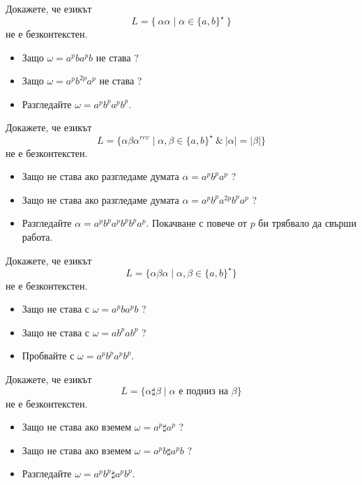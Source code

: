 \begin{problem}
  Докажете, че езикът 
  \[L = \{\ \alpha\alpha\mid \alpha\in \{a,b\}^\star\ \}\]
  не е безконтекстен.
\end{problem}
\begin{hint}
  \begin{itemize}
  \item 
    Защо $\omega = a^pba^pb$ не става ?
  \item
    Защо $\omega = a^pb^{2p}a^p$ не става ?
  \item
    Разгледайте $\omega = a^pb^pa^pb^p$.
  \end{itemize}
\end{hint}


\begin{problem}
  Докажете, че езикът 
  \[L = \{\alpha\beta\alpha^{rev} \mid \alpha,\beta \in \{a,b\}^\star\ \&\ |\alpha| = |\beta|\}\]
  не е безконтекстен.
\end{problem}
\begin{hint}
  \begin{itemize}
  \item
    Защо не става ако разгледаме думата $\alpha = a^pb^pa^p$ ?
  \item 
    Защо не става ако разгледаме думата $\alpha = a^p b^p a^{2p} b^p a^p$ ?
  \item
    Разгледайте $\alpha = a^p b^p a^p b^p b^p a^p$.
    Покачване с повече от $p$ би трябвало да свърши работа.
  \end{itemize}
\end{hint}


\begin{problem}
  Докажете, че езикът 
  \[L = \{\alpha\beta\alpha \mid \alpha,\beta \in \{a,b\}^\star\}\]
  не е безконтекстен.
\end{problem}
\begin{hint}
  \begin{itemize}
  \item 
    Защо не става с $\omega = a^pba^pb$ ?
  \item
    Защо не става с $\omega = ab^pab^p$ ?
  \item
    Пробвайте с $\omega = a^pb^pa^pb^p$.
  \end{itemize}
\end{hint}

\begin{problem}
  Докажете, че езикът
  \[L = \{\alpha\sharp\beta \mid \alpha\text{ е подниз на }\beta\}\]
  не е безконтекстен.
\end{problem}
\begin{hint}
  \begin{itemize}
  \item 
    Защо не става ако вземем $\omega = a^p \sharp a^p$ ?
  \item 
    Защо не става ако вземем $\omega = a^pb \sharp a^pb$ ?
  \item
    Разгледайте $\omega = a^pb^p\sharp a^pb^p$.
  \end{itemize}
\end{hint}


